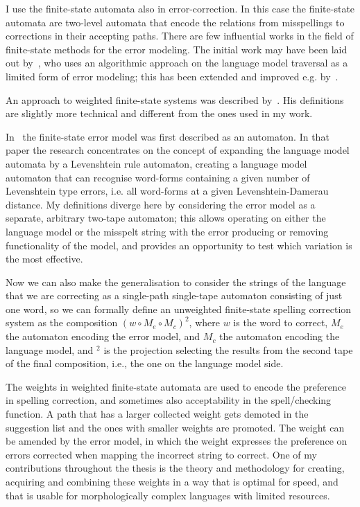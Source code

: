 \documentclass[officiallayout]{unihelcompling}
\begin{document}
I use the finite-state automata also in error-correction. In this case the
finite-state automata are two-level automata that encode the relations from
misspellings to corrections in their accepting paths. There are few influential
works in the field of finite-state methods for the error modeling. The initial
work may have been laid out by~\citet{oflazer1996errortolerant}, who uses an
algorithmic approach on the language model traversal as a limited form of error
modeling; this has been extended and improved e.g.  by~\citet{hulden2009fast}. 

An approach to weighted finite-state systems was described
by~\citet{mohri2003edit}. His definitions are slightly more technical and
different from the ones used in my work.

In~\citet{agata2002typographical} the finite-state error model was first
described as an automaton. In that paper the research concentrates on the
concept of expanding the language model automata by a Levenshtein rule
automaton, creating a language model automaton that can recognise word-forms
containing a given number of Levenshtein type errors, i.e. all word-forms at a
given Levenshtein-Damerau distance. My definitions diverge here by considering
the error model as a separate, arbitrary two-tape automaton; this allows
operating on either the language model or the misspelt string with the error
producing or removing functionality of the model, and provides an opportunity
to test which variation is the most effective. 

Now we can also make the generalisation to consider the strings of the language
that we are correcting as a single-path single-tape automaton consisting of
just one word, so we can formally define an unweighted finite-state spelling
correction system as the composition $(w \circ M_e \circ M_c)^2$, where $w$ is
the word to correct, $M_e$ the automaton encoding the error model, and $M_c$
the automaton encoding the language model, and $^2$ is the projection selecting
the results from the second tape of the final composition, i.e., the one on the
language model side.

The weights in weighted finite-state automata are used to encode the preference
in spelling correction, and sometimes also acceptability in the
spell\-/checking function. A path that has a larger collected weight gets
demoted in the suggestion list and the ones with smaller weights are promoted.
The weight can be amended by the error model, in which the weight expresses the
preference on errors corrected when mapping the incorrect string to correct.
One of my contributions throughout the thesis is the theory and methodology for
creating, acquiring and combining these weights in a way that is optimal for
speed, and that is usable for morphologically complex languages with limited
resources.
\end{document}

